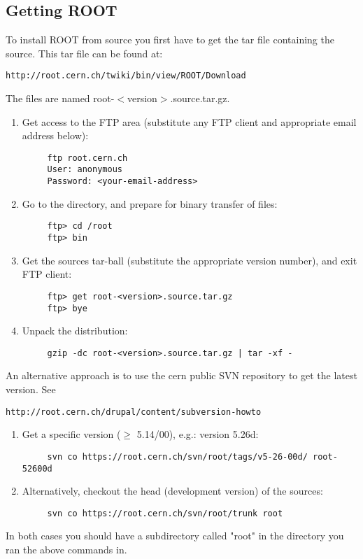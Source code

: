 \subsection{Getting ROOT}
To install ROOT from source you first have to get the tar file containing the source. This tar file can be found at:
\begin{lstlisting}
http://root.cern.ch/twiki/bin/view/ROOT/Download
\end{lstlisting}
The files are named root-$<$version$>$.source.tar.gz.
\begin{enumerate}
 \item Get access to the FTP area (substitute any FTP client and appropriate email address below):
\begin{lstlisting}
     ftp root.cern.ch
     User: anonymous
     Password: <your-email-address>
\end{lstlisting}
\item Go to the directory, and prepare for binary transfer of files:
\begin{lstlisting}
     ftp> cd /root
     ftp> bin
\end{lstlisting}
\item  Get the sources tar-ball (substitute the appropriate version number), and exit FTP client:
\begin{lstlisting}
     ftp> get root-<version>.source.tar.gz
     ftp> bye
\end{lstlisting}
\item Unpack the distribution:
\begin{lstlisting}
     gzip -dc root-<version>.source.tar.gz | tar -xf -
\end{lstlisting}
\end{enumerate}
\vspace{5mm}
An alternative approach is to use the cern public SVN repository to get the latest version. See
\begin{lstlisting}
http://root.cern.ch/drupal/content/subversion-howto
\end{lstlisting}
\begin{enumerate}
\item Get a specific version ($\geq$ 5.14/00), e.g.: version 5.26d:
\begin{lstlisting}
     svn co https://root.cern.ch/svn/root/tags/v5-26-00d/ root-52600d
\end{lstlisting}
\item Alternatively, checkout the head (development version) of the sources:
\begin{lstlisting}
     svn co https://root.cern.ch/svn/root/trunk root
\end{lstlisting}
\end{enumerate}
\vspace{5mm}
In both cases you should have a subdirectory called "root" in the directory you ran the above commands in.

